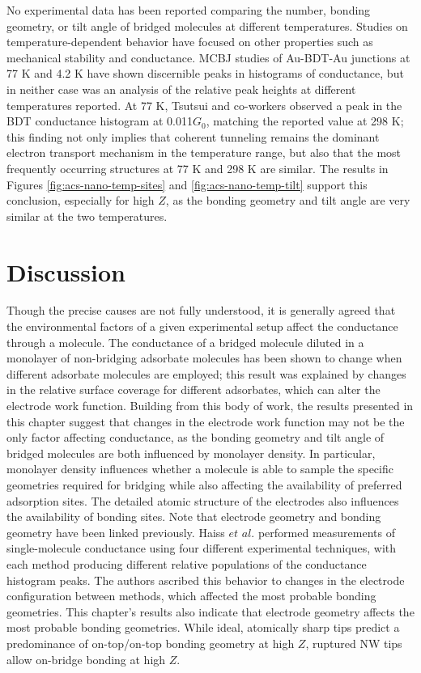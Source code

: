 \documentclass[10pt]{report}  %
\newcommand\findent{\hspace*{\parindent}}
\begin{document}
No experimental data has been reported comparing the number, bonding geometry, or tilt angle of bridged molecules at different temperatures.  Studies on temperature-dependent behavior have focused on other properties such as mechanical stability \cite{Tsutsui:2009} and conductance. \cite{Selzer:2004,Chen:2006}  MCBJ studies of Au-BDT-Au junctions at 77 K\cite{Tsutsui:2009} and 4.2 K\cite{Kim:2011} have shown discernible peaks in histograms of conductance, but in neither case was an analysis of the relative peak heights at different temperatures reported.  At 77 K, Tsutsui and co-workers \cite{Tsutsui:2009} observed a peak in the BDT conductance histogram at 0.011$G_{0}$, matching the reported value at 298 K; \cite{Tsutsui:2006,Xiao:2004} this finding not only implies that coherent tunneling remains the dominant electron transport mechanism in the temperature range, but also that the most frequently occurring structures at 77 K and 298 K are similar.  The results in Figures \ref{fig:acs-nano-temp-sites} and \ref{fig:acs-nano-temp-tilt} support this conclusion, especially for high $Z$, as the bonding geometry and tilt angle are very similar at the two temperatures.

\section{Discussion}

\findent Though the precise causes are not fully understood, it is generally agreed that the environmental factors of a given experimental setup affect the conductance through a molecule.  The conductance of a bridged molecule diluted in a monolayer of non-bridging adsorbate molecules has been shown to change when different adsorbate molecules are employed; \cite{Fatemi:2011} this result was explained by changes in the relative surface coverage for different adsorbates, which can alter the electrode work function.  Building from this body of work, the results presented in this chapter suggest that changes in the electrode work function may not be the only factor affecting conductance, as the bonding geometry and tilt angle of bridged molecules are both influenced by monolayer density.  In particular, monolayer density influences whether a molecule is able to sample the specific geometries required for bridging while also affecting the availability of preferred adsorption sites.  The detailed atomic structure of the electrodes also influences the availability of bonding sites.  Note that electrode geometry and bonding geometry have been linked previously. \cite{Haiss:2009}  Haiss $et$ $al.$ \cite{Haiss:2009} performed measurements of single-molecule conductance using four different experimental techniques, with each method producing different relative populations of the conductance histogram peaks.  The authors ascribed this behavior to changes in the electrode configuration between methods, which affected the most probable bonding geometries.  This chapter's results also indicate that electrode geometry affects the most probable bonding geometries.  While ideal, atomically sharp tips predict a predominance of on-top/on-top bonding geometry at high $Z$, ruptured NW tips allow on-bridge bonding at high $Z$.      
\end{document}
